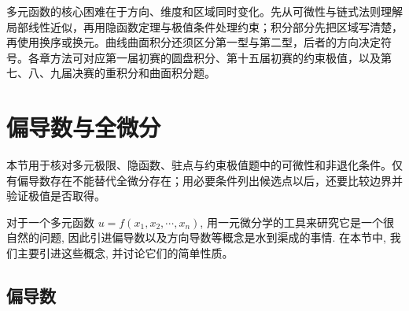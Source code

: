 \documentclass[UTF8,12pt,a4paper,fontset=fandol]{ctexart}
\begin{document}
多元函数的核心困难在于方向、维度和区域同时变化。先从可微性与链式法则理解局部线性近似，再用隐函数定理与极值条件处理约束；积分部分先把区域写清楚，再使用换序或换元。曲线曲面积分还须区分第一型与第二型，后者的方向决定符号。各章方法可对应第一届初赛的圆盘积分、第十五届初赛的约束极值，以及第七、八、九届决赛的重积分和曲面积分题。

\section{偏导数与全微分}\label{course-14-1}
本节用于核对多元极限、隐函数、驻点与约束极值题中的可微性和非退化条件。仅有偏导数存在不能替代全微分存在；用必要条件列出候选点以后，还要比较边界并验证极值是否取得。

对于一个多元函数 $u=f(x_1,x_2,\cdots,x_n)$, 用一元微分学的工具来研究它是一个很自然的问题, 因此引进偏导数以及方向导数等概念是水到渠成的事情. 在本节中, 我们主要引进这些概念, 并讨论它们的简单性质。

\subsection{偏导数}
\end{document}
